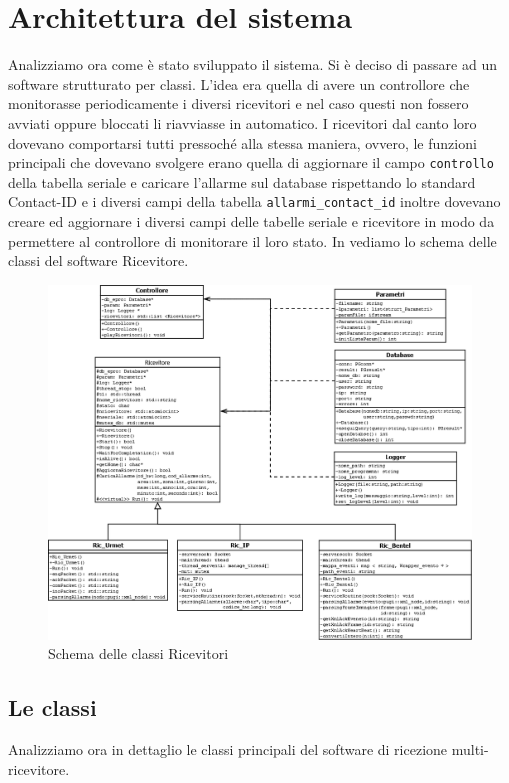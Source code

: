 \section{Architettura del sistema}
Analizziamo ora come è stato sviluppato il sistema. Si è deciso di passare ad un software strutturato per classi. L'idea era quella di avere un controllore che monitorasse periodicamente i diversi ricevitori e nel caso questi non fossero avviati oppure bloccati li riavviasse in automatico. I ricevitori dal canto loro dovevano comportarsi tutti pressoché alla stessa maniera, ovvero, le funzioni principali che dovevano svolgere erano quella di aggiornare il campo \texttt{controllo} della tabella seriale e caricare l'allarme sul database rispettando lo standard Contact-ID e i diversi campi della tabella \texttt{allarmi\_contact\_id} inoltre dovevano creare ed aggiornare i diversi campi delle tabelle seriale e ricevitore in modo da permettere al controllore di monitorare il loro stato. In  vediamo lo schema delle classi del software Ricevitore.
\begin{figure}[p]
	\centering
	\includegraphics[height=\textwidth, angle=90]{pictures/classiric.png}
	\caption{Schema delle classi Ricevitori}\label{fig:classiric}
\end{figure}
\subsection{Le classi}
Analizziamo ora in dettaglio le classi principali del software di ricezione multi-ricevitore.
